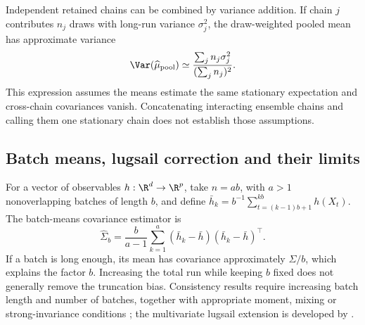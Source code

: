 Independent retained chains can be combined by variance addition. If chain
$j$ contributes $n_j$ draws with long-run variance $\sigma_j^2$, the
draw-weighted pooled mean has approximate variance
\begin{equation}
 \Var(\widehat\mu_{\rm pool})
   \simeq \frac{\sum_j n_j\sigma_j^2}{(\sum_j n_j)^2}.
 \label{eq:bf-modern-pooled-mcse}
\end{equation}
This expression assumes the means estimate the same stationary expectation
and cross-chain covariances vanish. Concatenating interacting ensemble chains
and calling them one stationary chain does not establish those assumptions.

\subsection{Batch means, lugsail correction and their limits}

For a vector of observables $h:\R^d\to\R^p$, take $n=ab$, with $a>1$
nonoverlapping batches of length $b$,
and define $\bar h_k=b^{-1}\sum_{t=(k-1)b+1}^{kb}h(X_t)$.
The batch-means covariance estimator is
\begin{equation}
 \widehat\Sigma_b=\frac{b}{a-1}
       \sum_{k=1}^a(\bar h_k-\bar h)(\bar h_k-\bar h)^\top.
 \label{eq:bf-modern-batch-means}
\end{equation}
If a batch is long enough, its mean has covariance approximately $\Sigma/b$,
which explains the factor $b$. Increasing the total run while keeping $b$
fixed does not generally remove the truncation bias. Consistency results
require increasing batch length and number of batches, together with
appropriate moment, mixing or strong-invariance conditions
\citep[Section 3]{flegal2010batchmeans}; the multivariate lugsail extension
is developed by \citet{vats2021lugsail}.

